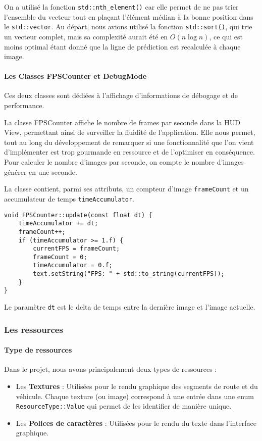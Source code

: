 On a utilisé la fonction \texttt{std::nth\_element()} car elle permet de ne pas trier l'ensemble du vecteur tout en plaçant l'élément médian à la bonne position dans le \texttt{std::vector}.
Au départ, nous avions utilisé la fonction \texttt{std::sort()}, qui trie un vecteur complet, mais sa complexité aurait été en \( O(n \log n) \)\cite{cpp_reference_std_sort}, ce qui est moins optimal étant donné que la ligne de prédiction est recalculée à chaque image.

\paragraph[FPSCounter \& DebugMode]{Les Classes FPSCounter et DebugMode}
Ces deux classes sont dédiées à l'affichage d'informations de débogage et de performance.

La classe FPSCounter affiche le nombre de frames par seconde dans la HUD View, permettant ainsi de surveiller la fluidité de l'application.
Elle nous permet, tout au long du développement de remarquer si une fonctionnalité que l'on vient d'implémenter est trop gourmande en ressource et de l'optimiser en conséquence.
Pour calculer le nombre d'images par seconde, on compte le nombre d'images générer en une seconde.

La classe contient, parmi ses attributs, un compteur d'image \texttt{frameCount} et un accumulateur de temps \texttt{timeAccumulator}.
\begin{lstlisting}[style=CStyle, label={lst:code_fpscounter}]
void FPSCounter::update(const float dt) {
    timeAccumulator += dt;
    frameCount++;
    if (timeAccumulator >= 1.f) {
        currentFPS = frameCount;
        frameCount = 0;
        timeAccumulator = 0.f;
        text.setString("FPS: " + std::to_string(currentFPS));
    }
}
\end{lstlisting}
Le paramètre \texttt{dt} est le delta de temps entre la dernière image et l'image actuelle.


\subsubsection{Les ressources}\label{subsubsec:gestion-des-ressources}
\paragraph{Type de ressources}
Dans le projet, nous avons principalement deux types de ressources :
\begin{itemize}
    \item Les \textbf{Textures} : Utilisées pour le rendu graphique des segments de route et du véhicule.
    Chaque texture (ou image) correspond à une entrée dans une enum \texttt{ResourceType::Value} qui permet de les identifier de manière unique.
    \item Les \textbf{Polices de caractères} : Utilisées pour le rendu du texte dans l'interface graphique.
\end{itemize}

